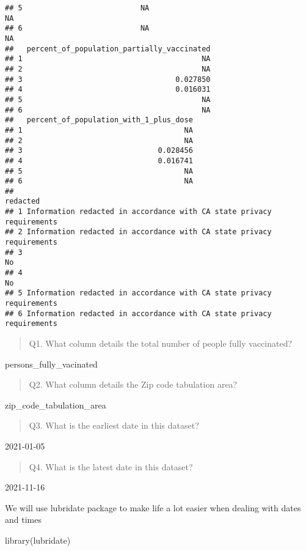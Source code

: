 \documentclass[
]{article}
\newenvironment{Shaded}{\begin{snugshade}}{\end{snugshade}}
\newcommand{\FunctionTok}[1]{\textcolor[rgb]{0.00,0.00,0.00}{#1}}
\newcommand{\NormalTok}[1]{#1}
\begin{document}
\begin{verbatim}
## 5                           NA                                     NA
## 6                           NA                                     NA
##   percent_of_population_partially_vaccinated
## 1                                         NA
## 2                                         NA
## 3                                   0.027850
## 4                                   0.016031
## 5                                         NA
## 6                                         NA
##   percent_of_population_with_1_plus_dose
## 1                                     NA
## 2                                     NA
## 3                               0.028456
## 4                               0.016741
## 5                                     NA
## 6                                     NA
##                                                                redacted
## 1 Information redacted in accordance with CA state privacy requirements
## 2 Information redacted in accordance with CA state privacy requirements
## 3                                                                    No
## 4                                                                    No
## 5 Information redacted in accordance with CA state privacy requirements
## 6 Information redacted in accordance with CA state privacy requirements
\end{verbatim}

\begin{quote}
Q1. What column details the total number of people fully vaccinated?
\end{quote}

persons\_fully\_vacinated

\begin{quote}
Q2. What column details the Zip code tabulation area?
\end{quote}

zip\_code\_tabulation\_area

\begin{quote}
Q3. What is the earliest date in this dataset?
\end{quote}

2021-01-05

\begin{quote}
Q4. What is the latest date in this dataset?
\end{quote}

2021-11-16

We will use lubridate package to make life a lot easier when dealing
with dates and times

\begin{Shaded}
\begin{Highlighting}[]
\FunctionTok{library}\NormalTok{(lubridate)}
\end{Highlighting}
\end{Shaded}
\end{document}
